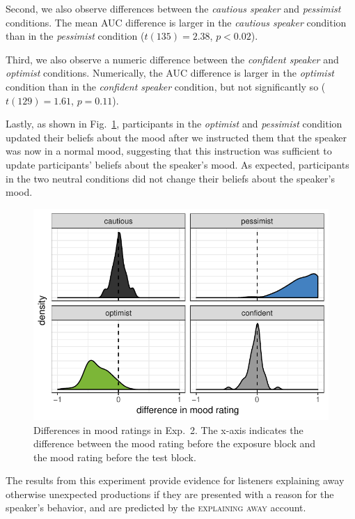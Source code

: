 Second, we also observe differences between the \textit{cautious speaker} and \textit{pessimist} conditions. The mean AUC difference is larger in the \textit{cautious speaker} condition than in the \textit{pessimist} condition  ($t(135)=2.38$, $p < 0.02$).

Third, we also observe a numeric difference between the \textit{confident speaker} and \textit{optimist} conditions. Numerically, the AUC difference is larger in the \textit{optimist} condition than in the \textit{confident speaker} condition, but not significantly so ($t(129) =1.61$, $p = 0.11$).

Lastly, as shown in Fig.~\ref{fig:manip-check-exp2}, participants in the \textit{optimist} and \textit{pessimist} condition updated their beliefs about the mood after we instructed them that the speaker was now in a normal mood, suggesting that this instruction was sufficient to update participants' beliefs about the speaker's mood. As expected, participants in the two neutral conditions did not change their beliefs about the speaker's mood. 

\begin{figure}[t]
    \includegraphics[width=\columnwidth, trim={0 0.75cm 0 0cm}]{./plots/mood-differences-exp2.pdf}
    \caption{Differences in mood ratings in Exp.~2. The x-axis indicates the difference between the mood rating before the exposure block and the mood rating before the test block.}
    \label{fig:manip-check-exp2}
\end{figure}


The results from this experiment provide evidence for listeners explaining away otherwise unexpected productions if they are presented with a reason for the speaker's behavior, and are predicted by the \textsc{explaining away} account. 

